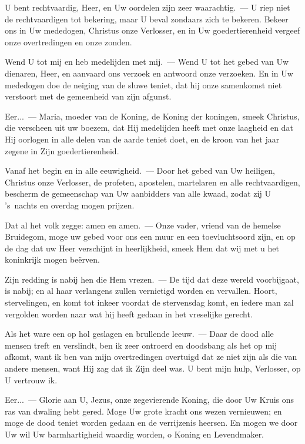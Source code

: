 \documentclass[12pt,twoside,a5paper]{article}
\begin{document}

\begin{halfparskip}
  U bent rechtvaardig, Heer, en Uw oordelen zijn zeer waarachtig.~--- U riep niet de rechtvaardigen tot bekering, maar U beval zondaars zich te bekeren. Bekeer ons in Uw mededogen, Christus onze Verlosser, en in Uw goedertierenheid vergeef onze overtredingen en onze zonden.

  Wend U tot mij en heb medelijden met mij.~--- Wend U tot het gebed van Uw dienaren, Heer, en aanvaard ons verzoek en antwoord onze verzoeken. En in Uw mededogen doe de neiging van de sluwe teniet, dat hij onze samenkomst niet verstoort met de gemeenheid van zijn afgunst.

  Eer...~--- Maria, moeder van de Koning, de Koning der koningen, smeek Christus, die verscheen uit uw boezem, dat Hij medelijden heeft met onze laagheid en dat Hij oorlogen in alle delen van de aarde teniet doet, en de kroon van het jaar zegene in Zijn goedertierenheid.

  Vanaf het begin en in alle eeuwigheid.~--- Door het gebed van Uw heiligen, Christus onze Verlosser, de profeten, apostelen, martelaren en alle rechtvaardigen, bescherm de gemeenschap van Uw aanbidders van alle kwaad, zodat zij U 's~nachts en overdag mogen prijzen.

  Dat al het volk zegge: amen en amen.~--- Onze vader, vriend van de hemelse Bruidegom, moge uw gebed voor ons een muur en een toevluchtsoord zijn, en op de dag dat uw Heer verschijnt in heerlijkheid, smeek Hem dat wij met u het koninkrijk mogen beërven.
\end{halfparskip}


\begin{halfparskip}
  Zijn redding is nabij hen die Hem vrezen.~--- De tijd dat deze wereld voorbijgaat, is nabij; en al haar verlangens zullen vernietigd worden en vervallen. Hoort, stervelingen, en komt tot inkeer voordat de stervensdag komt, en iedere man zal vergolden worden naar wat hij heeft gedaan in het vreselijke gerecht.

  Als het ware een op hol geslagen en brullende leeuw.~--- Daar de dood alle mensen treft en verslindt, ben ik zeer ontroerd en doodsbang als het op mij afkomt, want ik ben van mijn overtredingen overtuigd dat ze niet zijn als die van andere mensen, want Hij zag dat ik Zijn deel was. U bent mijn hulp, Verlosser, op U vertrouw ik.

  Eer...~--- Glorie aan U, Jezus, onze zegevierende Koning, die door Uw Kruis ons ras van dwaling hebt gered. Moge Uw grote kracht ons wezen vernieuwen; en moge de dood teniet worden gedaan en de verrijzenis heersen. En mogen we door Uw wil Uw barmhartigheid waardig worden, o Koning en Levendmaker.
\end{halfparskip}
\end{document}
